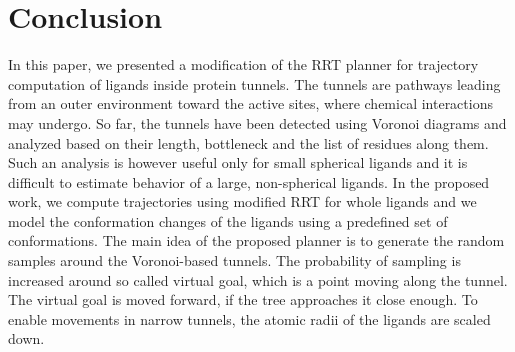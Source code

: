 \documentclass[usletter, 10pt, conference]{ieeeconf} %
\def\dt{d_{tunnel}}
\def\RI{R_{init}}
\def\rv{R_{tunnel}}
\def\L{\mathcal{L}}
\begin{document}




\section{Conclusion}

In this paper, we presented a modification of the RRT planner for trajectory computation of ligands inside protein tunnels.
The tunnels are pathways leading from an outer environment toward the active sites, where chemical interactions may undergo.
So far, the tunnels have been detected using Voronoi diagrams and analyzed based on their length, bottleneck and the list of residues along them.
Such an analysis is however useful only for small spherical ligands and it is difficult to estimate behavior of a large, non-spherical ligands.
In the proposed work, we compute trajectories using modified RRT for whole ligands and we model the conformation changes of the
ligands using a predefined set of conformations.
The main idea of the proposed planner is to generate the random samples around the Voronoi-based tunnels.
The probability of sampling is increased around so called virtual goal, which is a point moving along the tunnel. 
The virtual goal is moved forward, if the tree approaches it close enough.
To enable movements in narrow tunnels, the atomic radii of the ligands are scaled down.




\end{document}
